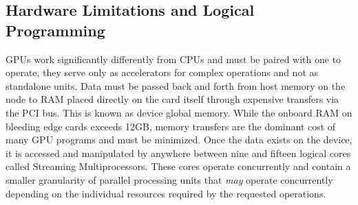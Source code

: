 \subsection{Hardware Limitations and Logical Programming}
GPUs work significantly differently from CPUs and must be paired with one to operate, they serve only as accelerators for complex operations and not as standalone units. Data must be passed back and forth from host memory on the node to RAM placed directly on the card itself through expensive transfers via the PCI bus. This is known as device global memory. While the onboard RAM on bleeding edge cards exceeds 12GB, memory transfers are the dominant cost of many GPU programs and must be minimized. Once the data exists on the device, it is accessed and manipulated by anywhere between nine and fifteen logical cores called Streaming Multiprocessors. These cores operate concurrently and contain a smaller granularity of parallel processing units that \textit{may} operate concurrently depending on the individual resources required by the requested operations.
